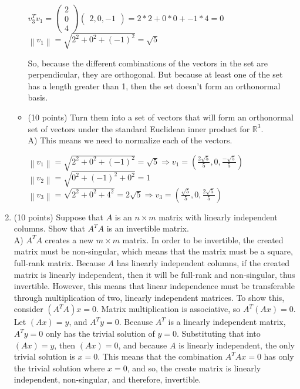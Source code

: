\documentclass[11pt]{article}
\begin{document}
\begin{enumerate}
\begin{itemize}
\begin{center}
            $v_3^Tv_1 = \begin{pmatrix} 2  \\ 0 \\ 4 \end{pmatrix} \begin{pmatrix} 2 , 0, -1 \end{pmatrix} = 2*2 + 0*0 + -1*4 = 0$
            $\left\lVert v_1 \right\rVert = \sqrt{2^2 + 0^2 + (-1)^2 } = \sqrt{5}$
      \end{center} 
      So, because the different combinations of the vectors in the set are perpendicular, they are orthogonal. But
      because at least one of the set has a length greater than 1, then the set doesn't form an orthonormal basis.
\item (10 points) Turn them into a set of vectors that will form an orthonormal set of 
      vectors under the standard Euclidean inner product for $\mathbb R^3$. \\
      A) This means we need to normalize each of the vectors.
      \begin{center}
            $\left\lVert v_1 \right\rVert = \sqrt{2^2 + 0^2 + (-1)^2 } = \sqrt{5} \Rightarrow v_1 = ( \frac{2\sqrt{5}}{5}, 0, \frac{-\sqrt{5}}{5})$
            $\left\lVert v_2 \right\rVert = \sqrt{0^2 + (-1)^2 + 0^2 } = 1$
            $\left\lVert v_3 \right\rVert = \sqrt{2^2 + 0^2 + 4^2 } = 2\sqrt{5}\Rightarrow v_3 = ( \frac{\sqrt{5}}{5}, 0, \frac{2\sqrt{5}}{5})$
      \end{center}
\end{itemize}

\item (10 points) Suppose that $A$ is an $n \times m$ matrix with linearly independent columns.
      Show that $A^T A$ is an invertible matrix. \\
      A) $A^T A$ creates a new $m \times m$ matrix. In order to be invertible, the created matrix must be 
      non-singular, which means that the matrix must be a square, full-rank matrix. Because $A$ has linearly independent columns,
      if the created matrix is linearly independent, then it will be full-rank and non-singular, thus invertible. 
      However, this means that linear independence must be transferable through multiplication of two, linearly independent 
      matrices. To show this, consider $(A^TA)x = 0$. Matrix multiplication is associative, so $A^T(Ax) = 0$. Let $(Ax) = y$, and
      $A^Ty = 0$. Because $A^T$ is a linearly independent matrix, $A^Ty = 0$ only has the trivial solution of $y = 0$. Substituting
      that into $(Ax) = y$, then $(Ax) = 0$, and because $A$ is linearly independent, the only trivial solution is $x = 0$. 
      This means that the combination $A^TAx=0$ has only the trivial solution where $x = 0$, and so, the create matrix is linearly
      independent, non-singular, and therefore, invertible.



\end{enumerate}
\end{document}
